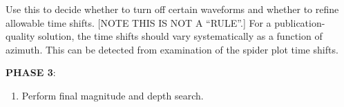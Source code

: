 \begin{enumerate}
\begin{enumerate}
Use this to decide whether to turn off certain waveforms and whether to refine allowable time shifts. [NOTE THIS IS NOT A ``RULE''.] For a publication-quality solution, the time shifts should vary systematically as a function of azimuth. This can be detected from examination of the spider plot time shifts.
\end{enumerate}

\medskip\noindent
{\bf PHASE 3}:

\begin{enumerate}
\item Perform final magnitude and depth search.


\end{enumerate}


\end{enumerate}

%
%

